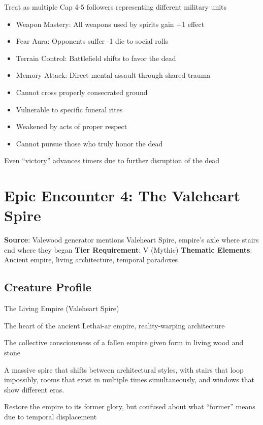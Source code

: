 \documentclass[11pt]{article}
\begin{document}
\begin{description}[leftmargin=*]
\item[Scale] Treat as multiple Cap 4-5 followers representing different military units
\item[Special Abilities]
\begin{itemize}
\item Weapon Mastery: All weapons used by spirits gain +1 effect
\item Fear Aura: Opponents suffer -1 die to social rolls
\item Terrain Control: Battlefield shifts to favor the dead
\item Memory Attack: Direct mental assault through shared trauma
\end{itemize}
\item[Weaknesses]
\begin{itemize}
\item Cannot cross properly consecrated ground
\item Vulnerable to specific funeral rites
\item Weakened by acts of proper respect
\item Cannot pursue those who truly honor the dead
\end{itemize}
\item[Consequences] Even ``victory'' advances timers due to further disruption of the dead
\end{description}

\section*{Epic Encounter 4: The Valeheart Spire}

\begin{mdframed}[backgroundcolor=epicbg]
\textbf{Source}: Valewood generator mentions Valeheart Spire, empire's axle where stairs end where they began
\textbf{Tier Requirement}: V (Mythic)
\textbf{Thematic Elements}: Ancient empire, living architecture, temporal paradoxes
\end{mdframed}

\subsection*{Creature Profile}

\begin{description}[leftmargin=*]
\item[Name] The Living Empire (Valeheart Spire)
\item[Domain] The heart of the ancient Lethai-ar empire, reality-warping architecture
\item[Nature] The collective consciousness of a fallen empire given form in living wood and stone
\item[Appearance] A massive spire that shifts between architectural styles, with stairs that loop impossibly, rooms that exist in multiple times simultaneously, and windows that show different eras.
\item[Motivation] Restore the empire to its former glory, but confused about what ``former'' means due to temporal displacement
\end{description}
\end{document}
